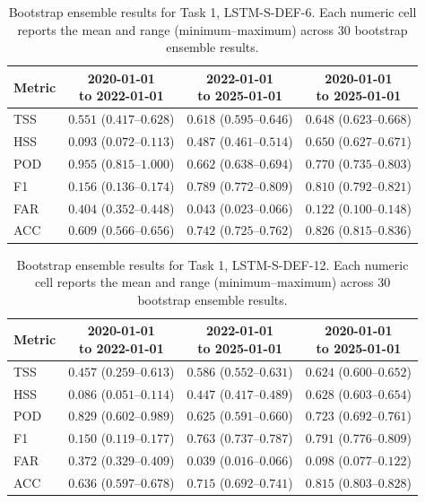\begin{table}[htbp]
\centering
\small
\caption{Bootstrap ensemble results for Task 1, LSTM-S-DEF-6. Each numeric cell reports the mean and range (minimum--maximum) across 30 bootstrap ensemble results.}
\label{tab:app-task1-lstm-s-def-6}
\begin{tabular}{lccc}
\toprule
Metric & \shortstack{2020-01-01\\to 2022-01-01} & \shortstack{2022-01-01\\to 2025-01-01} & \shortstack{2020-01-01\\to 2025-01-01} \\
\midrule
TSS & $0.551$ ($0.417$--$0.628$) & $0.618$ ($0.595$--$0.646$) & $0.648$ ($0.623$--$0.668$) \\
HSS & $0.093$ ($0.072$--$0.113$) & $0.487$ ($0.461$--$0.514$) & $0.650$ ($0.627$--$0.671$) \\
POD & $0.955$ ($0.815$--$1.000$) & $0.662$ ($0.638$--$0.694$) & $0.770$ ($0.735$--$0.803$) \\
F1 & $0.156$ ($0.136$--$0.174$) & $0.789$ ($0.772$--$0.809$) & $0.810$ ($0.792$--$0.821$) \\
FAR & $0.404$ ($0.352$--$0.448$) & $0.043$ ($0.023$--$0.066$) & $0.122$ ($0.100$--$0.148$) \\
ACC & $0.609$ ($0.566$--$0.656$) & $0.742$ ($0.725$--$0.762$) & $0.826$ ($0.815$--$0.836$) \\
\bottomrule
\end{tabular}
\end{table}
\clearpage

\begin{table}[htbp]
\centering
\small
\caption{Bootstrap ensemble results for Task 1, LSTM-S-DEF-12. Each numeric cell reports the mean and range (minimum--maximum) across 30 bootstrap ensemble results.}
\label{tab:app-task1-lstm-s-def-12}
\begin{tabular}{lccc}
\toprule
Metric & \shortstack{2020-01-01\\to 2022-01-01} & \shortstack{2022-01-01\\to 2025-01-01} & \shortstack{2020-01-01\\to 2025-01-01} \\
\midrule
TSS & $0.457$ ($0.259$--$0.613$) & $0.586$ ($0.552$--$0.631$) & $0.624$ ($0.600$--$0.652$) \\
HSS & $0.086$ ($0.051$--$0.114$) & $0.447$ ($0.417$--$0.489$) & $0.628$ ($0.603$--$0.654$) \\
POD & $0.829$ ($0.602$--$0.989$) & $0.625$ ($0.591$--$0.660$) & $0.723$ ($0.692$--$0.761$) \\
F1 & $0.150$ ($0.119$--$0.177$) & $0.763$ ($0.737$--$0.787$) & $0.791$ ($0.776$--$0.809$) \\
FAR & $0.372$ ($0.329$--$0.409$) & $0.039$ ($0.016$--$0.066$) & $0.098$ ($0.077$--$0.122$) \\
ACC & $0.636$ ($0.597$--$0.678$) & $0.715$ ($0.692$--$0.741$) & $0.815$ ($0.803$--$0.828$) \\
\bottomrule
\end{tabular}
\end{table}
\clearpage

